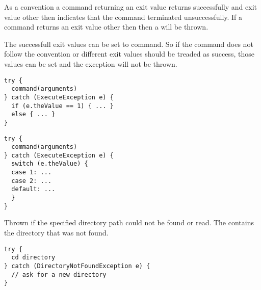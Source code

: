 As a convention a command returning an exit value  returns 
successfully and exit value other then  indicates that the command
terminated unsuccessfully. If a command returns an exit value other then 
then a  will be thrown.

The successfull exit values can be set to command. So if the command does not
follow the convention or different exit values should be treaded as success,
those values can be set and the exception will not be thrown.

\begin{lstlisting}[style=Groovybash, label={lst:example_execute_exception1}]
try {
  command(arguments)
} catch (ExecuteException e) {
  if (e.theValue == 1) { ... }
  else { ... }
}
\end{lstlisting}

\begin{lstlisting}[style=Groovybash, label={lst:example_execute_exception2}]
try {
  command(arguments)
} catch (ExecuteException e) {
  switch (e.theValue) {
  case 1: ...
  case 2: ...
  default: ...
  }
}
\end{lstlisting}

%

Thrown if the specified directory path could not be found or read. 
The  contains the directory\cite{file13}
that was not found.

\begin{lstlisting}[style=Groovybash, label={lst:example_execute_exception1}]
try {
  cd directory
} catch (DirectoryNotFoundException e) {
  // ask for a new directory
}
\end{lstlisting}

